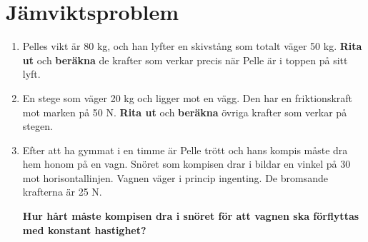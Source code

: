 \documentclass[11pt]{article}
\begin{document}
\raggedright
\setcounter{section}{1}
\section{Jämviktsproblem}

\begin{enumerate}[itemsep=2em]
        \item
              \begin{minipage}[t]{0.6\textwidth}
                      Pelles vikt är 80 kg, och han lyfter en skivstång som totalt väger 50 kg. \textbf{Rita ut} och \textbf{beräkna} de krafter som verkar precis när Pelle är i toppen på sitt lyft.
              \end{minipage}
              \hspace{2em}
              \begin{adjustbox}{valign=t}
                      
              \end{adjustbox}
        \item
              \begin{minipage}[t]{0.6\textwidth}
                      En stege som väger 20 kg och ligger mot en vägg. Den har en friktionskraft mot marken på 50 N. \textbf{Rita ut} och \textbf{beräkna} övriga krafter som verkar på stegen.
              \end{minipage}
              \hspace{2em}
              \begin{adjustbox}{valign=t}
                      
              \end{adjustbox}
        \item
              \raggedright
              \setlength{\parskip}{1em}
              Efter att ha gymmat i en timme är Pelle trött och hans kompis måste dra hem honom på en vagn. Snöret som kompisen drar i bildar en vinkel på 30\degree{} mot horisontallinjen. Vagnen väger i princip ingenting. De bromsande krafterna är 25 N.

              \textbf{Hur hårt måste kompisen dra i snöret för att vagnen ska förflyttas med konstant hastighet?}

              \begin{center}
                      
              \end{center}
\end{enumerate}

\newpage
\end{document}
